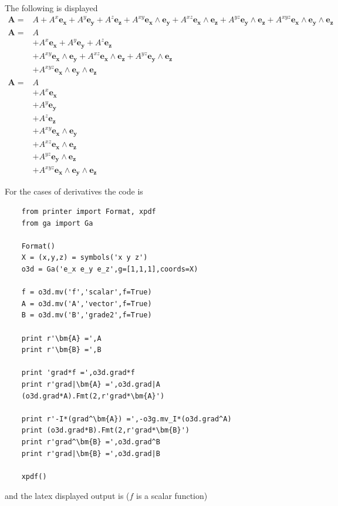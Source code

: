 \documentclass[12pt]{report}
\newcommand{\bm}[1]{\boldsymbol{#1}}
\newcommand{\W}{\wedge}
\begin{document}
The following is displayed
\begin{align*}
      \bm{A} = & A+A^{x}\bm{e_{x}}+A^{y}\bm{e_{y}}+A^{z}\bm{e_{z}}+A^{xy}\bm{e_{x}\W e_{y}}+A^{xz}\bm{e_{x}\W e_{z}}+A^{yz}\bm{e_{y}\W e_{z}}+A^{xyz}\bm{e_{x}\W e_{y}\W e_{z}} \\
      \bm{A} =  & A \\  & +A^{x}\bm{e_{x}}+A^{y}\bm{e_{y}}+A^{z}\bm{e_{z}} \\  & +A^{xy}\bm{e_{x}\W e_{y}}+A^{xz}\bm{e_{x}\W e_{z}}+A^{yz}\bm{e_{y}\W e_{z}} \\  & +A^{xyz}\bm{e_{x}\W e_{y}\W e_{z}} \\
      \bm{A} =  & A \\  & +A^{x}\bm{e_{x}} \\  & +A^{y}\bm{e_{y}} \\  & +A^{z}\bm{e_{z}} \\  & +A^{xy}\bm{e_{x}\W e_{y}} \\  & +A^{xz}\bm{e_{x}\W e_{z}} \\  & +A^{yz}\bm{e_{y}\W e_{z}} \\  & +A^{xyz}\bm{e_{x}\W e_{y}\W e_{z}}
\end{align*}

For the cases of derivatives the code is

\begin{lstlisting}
    from printer import Format, xpdf
    from ga import Ga

    Format()
    X = (x,y,z) = symbols('x y z')
    o3d = Ga('e_x e_y e_z',g=[1,1,1],coords=X)

    f = o3d.mv('f','scalar',f=True)
    A = o3d.mv('A','vector',f=True)
    B = o3d.mv('B','grade2',f=True)

    print r'\bm{A} =',A
    print r'\bm{B} =',B

    print 'grad*f =',o3d.grad*f
    print r'grad|\bm{A} =',o3d.grad|A
    (o3d.grad*A).Fmt(2,r'grad*\bm{A}')

    print r'-I*(grad^\bm{A}) =',-o3g.mv_I*(o3d.grad^A)
    print (o3d.grad*B).Fmt(2,r'grad*\bm{B}')
    print r'grad^\bm{B} =',o3d.grad^B
    print r'grad|\bm{B} =',o3d.grad|B

    xpdf()
\end{lstlisting}

and the latex displayed output is ($f$ is a scalar function)
\end{document}

